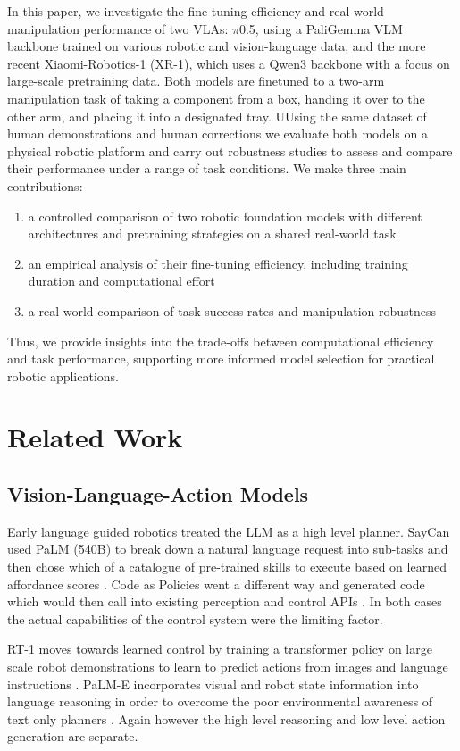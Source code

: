 \documentclass[10pt,twocolumn,letterpaper]{article}
\begin{document}
In this paper, we investigate the fine-tuning efficiency and real-world manipulation performance of two VLAs: $\pi$0.5, using a PaliGemma VLM backbone trained on various robotic and vision-language data, and the more recent Xiaomi-Robotics-1 (XR-1), which uses a Qwen3 backbone with a focus on large-scale pretraining data. Both models are finetuned to a two-arm manipulation task of taking a component from a box, handing it over to the other arm, and placing it into a designated tray. UUsing the same dataset of human demonstrations and human corrections we evaluate both models on a physical robotic platform and carry out robustness studies to assess and compare their performance under a range of task conditions.
We make three main contributions: 
\begin{enumerate}
    \item a controlled comparison of two robotic foundation models with different architectures and pretraining strategies on a shared real-world task
    \item an empirical analysis of their fine-tuning efficiency, including training duration and computational effort
    \item a real-world comparison of task success rates and manipulation robustness
\end{enumerate}
Thus, we provide insights into the trade-offs between computational efficiency and task performance, supporting more informed model selection for practical robotic applications.

\section{Related Work}

\subsection{Vision-Language-Action Models}
Early language guided robotics treated the LLM as a high level planner. SayCan used PaLM (540B) to break down a natural language request into sub-tasks and then chose which of a catalogue of pre-trained skills to execute based on learned affordance scores \cite{ahn2022saycan}. Code as Policies went a different way and generated code which would then call into existing perception and control APIs \cite{liang2023code}. In both cases the actual capabilities of the control system were the limiting factor.

RT-1 moves towards learned control by training a transformer policy on large scale robot demonstrations to learn to predict actions from images and language instructions \cite{brohan2023rt1}. PaLM-E incorporates visual and robot state information into language reasoning in order to overcome the poor environmental awareness of text only planners \cite{driess2023palme}. Again however the high level reasoning and low level action generation are separate.
\end{document}

